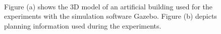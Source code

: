 \begin{figure}[thpb]
     \footnotesize
      \centering
      \myfloatalign
      \setlength\fboxsep{0pt}
      \setlength\fboxrule{0.5pt}
       \\
       \caption[Simulation: artificial environment]{Figure (a) shows the 3D model of an artificial building used for the experiments with the simulation software Gazebo. Figure (b) depicts planning information used during the experiments.}
      \label{fig:gazebo_v4r}
   \end{figure}

